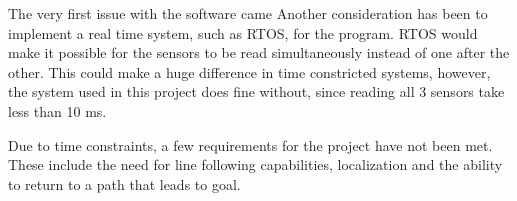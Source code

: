 The very first issue with the software came 
Another consideration has been to implement a real time system, such as RTOS, for the program. RTOS would make it possible for the sensors to be read simultaneously instead of one after the other. This could make a huge difference in time constricted systems, however, the system used in this project does fine without, since reading all 3 sensors take less than 10 ms.

Due to time constraints, a few requirements for the project have not been met. These include the need for line following capabilities, localization and the ability to return to a path that leads to goal.